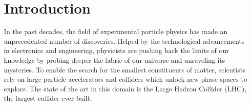\chapter*{Introduction}
\label{chap:0-4-introduction}

  In the past decades, the field of experimental particle physics has made an unprecedented number of discoveries. Helped by the technological advancements in electronics and engineering, physicists are pushing back the limits of our knowledge by probing deeper the fabric of our universe and unraveling its mysteries. To enable the search for the smallest constituents of matter, scientists rely on large particle accelerators and colliders which unlock new phase-spaces to explore. The state of the art in this domain is the Large Hadron Collider (LHC), the largest collider ever built.
